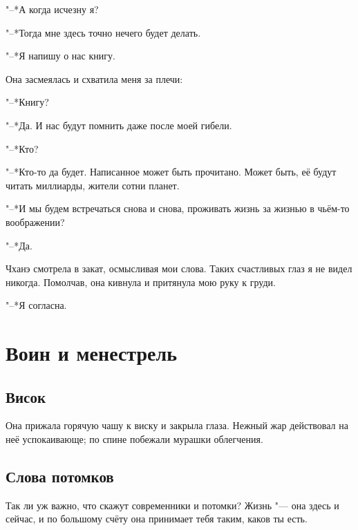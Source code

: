 \documentclass[a4paper,10pt,fleqn]{book}
\newcommand{\mulang}[3]{#2}%
\begin{document}
"--*А когда исчезну я?

"--*Тогда мне здесь точно нечего будет делать.

\mulang{}{"--*Я напишу о нас книгу.}
{``I'll write a book about us.''}

Она засмеялась и схватила меня за плечи:

\mulang{}{"--*Книгу?}
{``A book?''}

\mulang{}{"--*Да.}
{``Yes.}
\mulang{}{И нас будут помнить даже после моей гибели.}
{We'll be remembered even after my death.''}

\mulang{}{"--*Кто?}
{``But who will remember?''}

\mulang{}{"--*Кто-то да будет.}
{``Somebody will.}
\mulang{}{Написанное может быть прочитано.}
{Written might be read.}
\mulang{}{Может быть, её будут читать миллиарды, жители сотни планет.}
{I guess billions of folk, dwellers of hundred planets will read this story.''}

\mulang{}{"--*И мы будем встречаться снова и снова, проживать жизнь за жизнью в чьём-то воображении?}
{``And we will meet and meet again, we will live life by life in the mind's eye of somebody, won't we?''}

\mulang{}{"--*Да.}
{``Yes, we will.''}

Чханэ смотрела в закат, осмысливая мои слова.
Таких счастливых глаз я не видел никогда.
Помолчав, она кивнула и притянула мою руку к груди.

\mulang{}{"--*Я согласна.}
{``I accept it.''}

\chapter{Воин и менестрель}

\section{Висок}

Она прижала горячую чашу к виску и закрыла глаза.
Нежный жар действовал на неё успокаивающе;
по спине побежали мурашки облегчения.

\section{Слова потомков}

Так ли уж важно, что скажут современники и потомки?
Жизнь "--- она здесь и сейчас, и по большому счёту она принимает тебя таким, каков ты есть.
\end{document}
